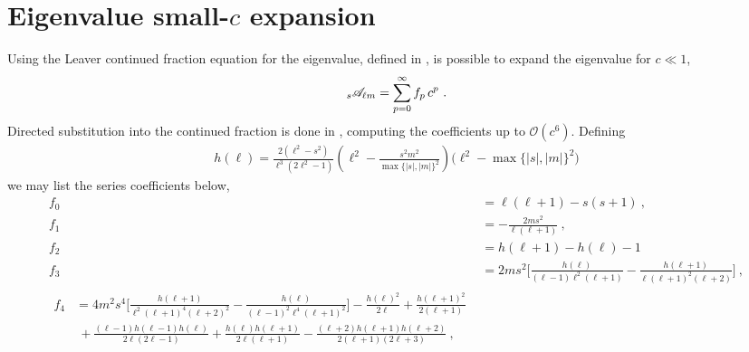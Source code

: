
\chapter{Eigenvalue small-$c$ expansion}
\label{AppendixEigenvalues}

Using the Leaver continued fraction equation for the eigenvalue, defined in , is possible to expand the eigenvalue for $c\ll 1$,
\begin{align}
    \uu[s]{\mathscr{A}}{\ell m} = \sum_{p=0}^\infty f_p \,c^p ~.
\end{align}
Directed substitution into the continued fraction is done in \cite{Fackerell1977,Seidel1989}, computing the coefficients up to $\mathscr{O}(c^6)$.
Defining
\begin{align}
    h(\ell) = \frac{2 \left(\ell^2-s^2\right)}{\ell^3 (2 \ell^2 -1) } \left( \ell^2 - \frac{s^2 m^2}{\max\{|s|,|m|\}^2} \right) \Big( \ell^2 - \max\{|s|,|m|\}^2 \Big) 
\end{align}
we may list the series coefficients below,
\begin{subequations}
\begin{align}
    f_0 &= \ell (\ell+1) - s(s+1) ~, \\[0.15cm]
    f_1 &= -\frac{2 m s^2}{\ell (\ell+1)} ~,\\[0.15cm]
    f_2 &= h(\ell+1) - h(\ell) -1 \\[0.15cm]
    f_3 &= 2 m s^2 \bigg[ \frac{ h(\ell)}{(\ell-1) \ell^2 (\ell+1)}-\frac{h(\ell+1)}{\ell (\ell+1)^2
    (\ell+2)} \bigg] ~, \\[0.15cm]
    \begin{split}
        f_4 &= 4 m^2 s^4 \bigg[ \frac{h(\ell+1)}{\ell^2 (\ell+1)^4 (\ell+2)^2} 
        - \frac{h(\ell)}{(\ell-1)^2 \ell^4 (\ell+1)^2} \bigg] 
        - \frac{h(\ell)^2}{2\ell} +\frac{h(\ell+1)^2}{2 (\ell+1)} \\
        &~ + \frac{(\ell-1) h(\ell-1) h(\ell)}{2 \ell (2\ell-1)} + \frac{h(\ell) h(\ell+1)}{2 \ell (\ell+1)} 
        - \frac{(\ell+2) h(\ell+1) h(\ell+2)}{2(\ell+1) (2 \ell+3)} ~,
    \end{split}
\end{align}
\end{subequations}
